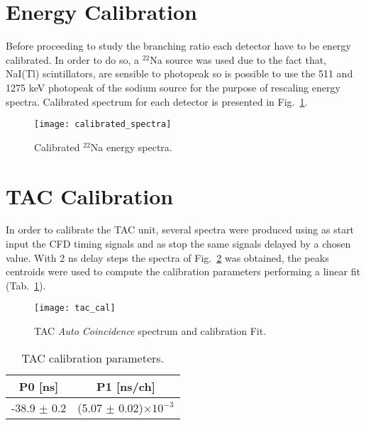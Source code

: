 \section*{Energy Calibration}

Before proceeding to study the branching ratio each detector have to be energy calibrated. In order to do so, a $^{22}$Na source was used due to the fact that, NaI(Tl) scintillators, are sensible to photopeak so is possible to use the 511 and  1275 keV photopeak of the sodium source for the purpose of rescaling energy spectra. Calibrated spectrum for each detector is presented in Fig.~\ref{Fig: calibrated spectra}.

\begin{figure}[H]
\centering
\texttt{[image: calibrated\_spectra]}
\caption{Calibrated $^{22}$Na energy spectra.}
\label{Fig: calibrated spectra}
\end{figure}


\section*{TAC Calibration}

In order to calibrate the TAC unit, several spectra were produced using as start
input the CFD timing signals and as stop the same signals delayed by a chosen
value. With 2 ns delay steps the spectra of Fig.~\ref{Fig: tac calibration} was obtained, the peaks
centroids were used to compute the calibration parameters performing a linear fit (Tab.~\ref{Tab: tac calibration parameters}).

\begin{figure}[H]
\centering
\texttt{[image: tac\_cal]}
\caption{TAC \textit{Auto Coincidence} spectrum and calibration Fit.}
\label{Fig: tac calibration}
\end{figure}
\begin{table}[H]
\centering
\begin{tabular}{cc}
\toprule
P0 [ns] & P1 [ns/ch] \\
\midrule
-38.9 $\pm$ 0.2 & (5.07 $\pm$ 0.02)$\times 10^{-3}$\\
\bottomrule
\end{tabular}
\caption{TAC calibration parameters.}
\label{Tab: tac calibration parameters}
\end{table}

